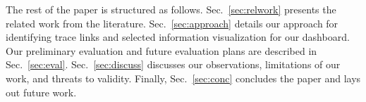 The rest of the paper is structured as follows. Sec.~\ref{sec:relwork} presents the related work from the literature. Sec.~\ref{sec:approach} details our approach for identifying trace links and selected information visualization for our dashboard. Our preliminary evaluation and future evaluation plans are described in Sec.~\ref{sec:eval}. Sec.~\ref{sec:discuss} discusses our observations, limitations of our work, and threats to validity. Finally, Sec.~\ref{sec:conc} concludes the paper and lays out future work.

